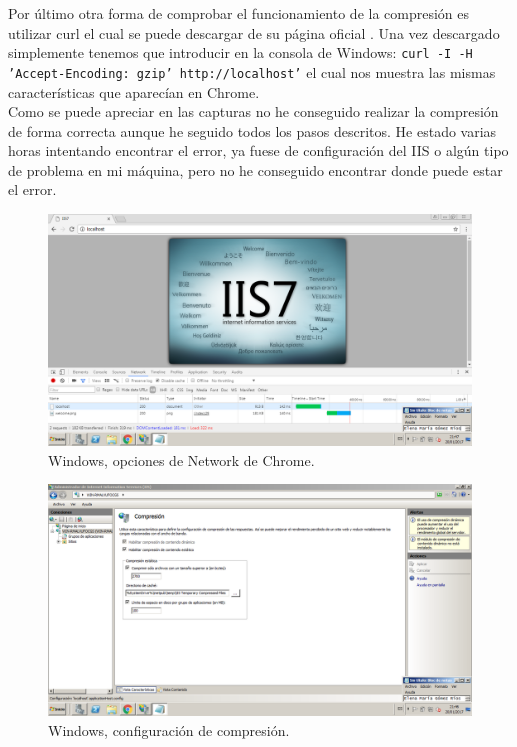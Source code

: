 Por último otra forma de comprobar el funcionamiento de la compresión es utilizar curl el cual se puede descargar de su página oficial \cite{curl}. Una vez descargado simplemente tenemos que introducir en la consola de Windows: \texttt{curl -I -H 'Accept-Encoding: gzip' http://localhost'} el cual nos muestra las mismas características que aparecían en Chrome.\\

Como se puede apreciar en las capturas no he conseguido realizar la compresión de forma correcta aunque he seguido todos los pasos descritos. He estado varias horas intentando encontrar el error, ya fuese de configuración del IIS o algún tipo de problema en mi máquina, pero no he conseguido encontrar donde puede estar el error. 

\begin{figure}[H] 
	\centering
	\includegraphics[width=14.7cm]{./img/ejercicio5_1.png} 	
	\caption{Windows, opciones de Network de Chrome.} \label{fig:ejercicio5_1}
\end{figure}

\begin{figure}[H] 
	\centering
	\includegraphics[width=14.7cm]{./img/ejercicio5_2.png} 	
	\caption{Windows, configuración de compresión.} \label{fig:ejercicio5_2}
\end{figure}

